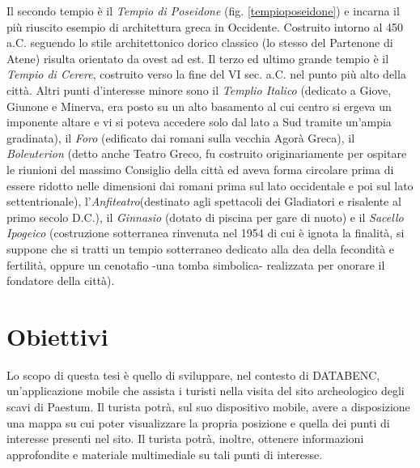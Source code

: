 Il secondo tempio è il \emph{Tempio di Poseidone} (fig. \ref{tempioposeidone}) e incarna il più riuscito esempio di architettura greca in Occidente. Costruito intorno al 450 a.C. seguendo lo stile architettonico dorico classico (lo stesso del Partenone di Atene) risulta orientato da ovest ad est. Il terzo ed ultimo grande tempio è il \emph{Tempio di Cerere}, costruito verso la fine del VI sec. a.C. nel punto più alto della città. Altri punti d'interesse minore sono il \emph{Templio Italico} (dedicato a Giove, Giunone e Minerva, era posto su un alto basamento al cui centro si ergeva un imponente altare e vi si poteva accedere solo dal lato a Sud tramite un'ampia gradinata), il \emph{Foro} (edificato dai romani sulla vecchia Agorà Greca), il \emph{Boleuterion} (detto anche Teatro Greco, fu costruito originariamente per ospitare le riunioni del massimo Consiglio della città ed aveva forma circolare prima di essere ridotto nelle dimensioni dai romani prima sul lato occidentale e poi sul lato settentrionale), l'\emph{Anfiteatro}(destinato agli spettacoli dei Gladiatori e risalente al primo secolo D.C.), il \emph{Ginnasio} (dotato di piscina per gare di nuoto) e il \emph{Sacello Ipogeico} (costruzione sotterranea rinvenuta nel 1954 di cui è ignota la finalità, si suppone che si tratti un tempio sotterraneo dedicato alla dea della fecondità e fertilità, oppure un cenotafio -una tomba simbolica- realizzata per onorare il fondatore della città).
\section{Obiettivi}
Lo scopo di questa tesi è quello di sviluppare, nel contesto di DATABENC, un'applicazione mobile che assista i turisti nella visita del sito archeologico degli scavi di Paestum.
Il turista potrà, sul suo dispositivo mobile, avere a disposizione una mappa su cui poter visualizzare la propria posizione e quella dei punti di interesse presenti nel sito.
Il turista potrà, inoltre, ottenere informazioni approfondite e materiale multimediale su tali punti di interesse. 





\clearpage{\pagestyle{empty}\cleardoublepage}

